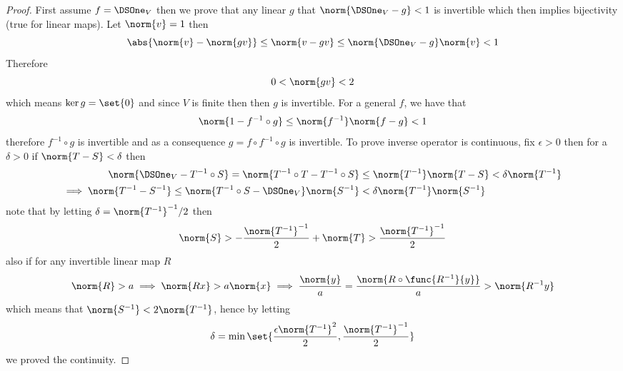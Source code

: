 \begin{proof}
    First assume \(f = \DSOne_V\) then we prove that any linear \(g\) that \(\norm{\DSOne_V - g} < 1\) is invertible which then implies bijectivity (true for linear maps). Let \(\norm{v} = 1\) then
    \begin{equation*}
        \abs{\norm{v} - \norm{gv}} \leq \norm{v - gv} \leq \norm{\DSOne_V - g} \norm{v} < 1
    \end{equation*}
    Therefore
    \begin{equation*}
        0 < \norm{gv} < 2
    \end{equation*}
    which means \(\ker g = \set{0}\) and since \(V\) is finite then then \(g\) is invertible. For a general \(f\), we have that
    \begin{equation*}
        \norm{1 - f^{-1} \circ g} \leq \norm{f^{-1}}\norm{f -g} < 1
    \end{equation*}
    therefore \(f^{-1} \circ g\) is invertible and as a consequence \(g = f \circ f^{-1} \circ g\) is invertible. To prove inverse operator is continuous, fix \(\epsilon > 0\) then for a \(\delta > 0\) if \(\norm{T-S} < \delta\) then
    \begin{align*}
        \norm{\DSOne_V- T^{-1} \circ S}= \norm{T^{-1} \circ T  - T^{-1} \circ S}           & \leq \norm{T^{-1}} \norm{T-S} < \delta \norm{T^{-1}} \\
        \implies  \norm{T^{-1} - S^{-1}} \leq \norm{T^{-1}\circ S - \DSOne_V}\norm{S^{-1}} & < \delta \norm{T^{-1}} \norm{S^{-1}}
    \end{align*}
    note that by letting \(\delta = \norm{T^{-1}}^{-1}/2\) then
    \begin{equation*}
        \norm{S} > -\dfrac{\norm{T^{-1}}^{-1}}{2} + \norm{T} > \dfrac{\norm{T^{-1}}^{-1}}{2}
    \end{equation*}
    also if for any invertible linear map \(R\)
    \begin{equation*}
        \norm{R} > a \implies \norm{Rx} > a\norm{x} \implies \dfrac{\norm{y}}{a} = \dfrac{\norm{R\circ \func{R^{-1}}{y}}}{a} > \norm{R^{-1}y}
    \end{equation*}
    which means that \(\norm{S^{-1}} < 2 \norm{T^{-1}}\), hence by letting
    \begin{equation*}
        \delta = \min \set{\dfrac{\epsilon \norm{T^{-1}}^2}{2} , \dfrac{\norm{T^{-1}}^{-1}}{2}}
    \end{equation*}
    we proved the continuity.
\end{proof}


